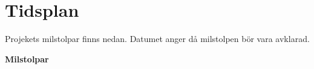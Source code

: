 \documentclass[12pt,a4paper]{article}
\begin{document}
%
%
%
%
%
%
%
%
%
%

\section{Tidsplan}

Projekets milstolpar finns nedan. Datumet anger då milstolpen bör vara avklarad.

\textbf{Milstolpar}
\end{document}
